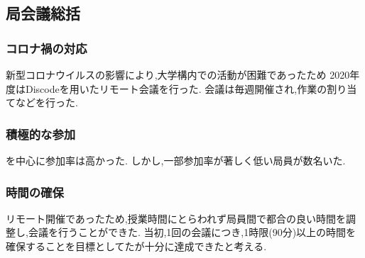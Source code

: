 \subsection*{局会議総括}

\subsubsection*{コロナ禍の対応}

新型コロナウイルスの影響により,大学構内での活動が困難であったため
2020年度はDiscodeを用いたリモート会議を行った.
会議は毎週開催され,作業の割り当てなどを行った.

\subsubsection*{積極的な参加}

\secondGrade{}を中心に参加率は高かった.
しかし,一部参加率が著しく低い局員が数名いた.

\subsubsection*{時間の確保}

リモート開催であったため,授業時間にとらわれず局員間で都合の良い時間を調整し,会議を行うことができた.
当初,1回の会議につき,1時限(90分)以上の時間を確保することを目標としてたが十分に達成できたと考える.

